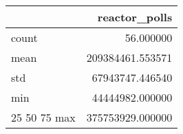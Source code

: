 \begin{tabular}{lr}
\toprule
 & reactor\_polls \\
\midrule
count & 56.000000 \\
mean & 209384461.553571 \\
std & 67943747.446540 \\
min & 44444982.000000 \\
25%
50%
75%
max & 375753929.000000 \\
\bottomrule
\end{tabular}

